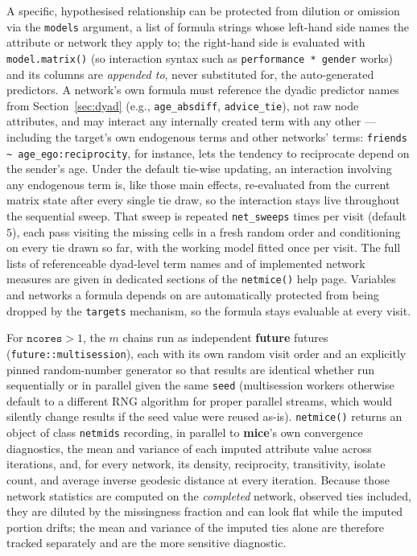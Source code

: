 \documentclass[11pt,a4paper]{article}
\newcommand{\pkg}[1]{\textbf{#1}}
\newcommand{\code}[1]{\texttt{#1}}
\begin{document}
A specific, hypothesised relationship can be protected from dilution or
omission via the \code{models} argument, a list of formula strings whose
left-hand side names the attribute or network they apply to; the
right-hand side is evaluated with \code{model.matrix()} (so interaction
syntax such as \code{performance * gender} works) and its columns are
\emph{appended to}, never substituted for, the auto-generated predictors.
A network's own formula must reference the dyadic predictor names from
Section~\ref{sec:dyad} (e.g., \code{age\_absdiff}, \code{advice\_tie}), not
raw node attributes, and may interact any internally created term with any
other --- including the target's own endogenous terms and other networks'
terms: \code{friends \~{} age\_ego:reciprocity}, for instance, lets the
tendency to reciprocate depend on the sender's age. Under the default
tie-wise updating, an interaction involving any endogenous term is, like those
main effects, re-evaluated from the current matrix state after every single
tie draw, so the interaction stays live throughout the sequential sweep. That
sweep is repeated \code{net\_sweeps} times per visit (default $5$), each pass
visiting the missing cells in a fresh random order and conditioning on every
tie drawn so far, with the working model fitted once per visit. The full lists of referenceable dyad-level
term names and of implemented network measures are given in dedicated
sections of the \code{netmice()} help page. Variables and networks a
formula depends on are automatically protected from being dropped by
the \code{targets} mechanism, so the formula stays evaluable at every
visit.

For $\code{ncores} > 1$, the $m$ chains run as independent \pkg{future}
futures (\code{future::multisession}), each with its own random visit order
and an explicitly pinned random-number generator so that results are
identical whether run sequentially or in parallel given the same
\code{seed} (multisession workers otherwise default to a different RNG
algorithm for proper parallel streams, which would silently change results
if the seed value were reused as-is). \code{netmice()} returns an object of
class \code{netmids} recording, in parallel to \pkg{mice}'s own convergence
diagnostics, the mean and variance of each imputed attribute
value across iterations, and, for every network, its density, reciprocity,
transitivity, isolate count, and average inverse geodesic distance at every
iteration. Because those network statistics are computed on the
\emph{completed} network, observed ties included, they are diluted by the
missingness fraction and can look flat while the imputed portion drifts; the
mean and variance of the imputed ties alone are therefore tracked separately
and are the more sensitive diagnostic.
\end{document}
